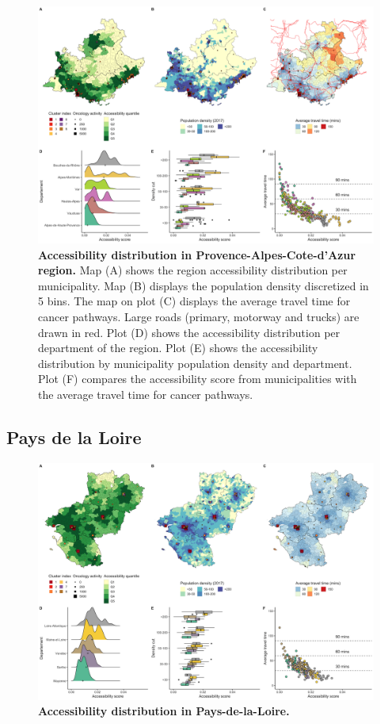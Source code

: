 \begin{figure}[H]
    \includegraphics[width=\textwidth]{images/camion/fig4_accessibility_Provence-Alpes-Cote-d'Azur.png}
    \centering
    \caption{
        \textbf{Accessibility distribution in Provence-Alpes-Cote-d'Azur region.} Map (A) shows the region accessibility distribution per municipality. Map (B) displays the population density discretized in 5 bins. The map on plot (C) displays the average travel time for cancer pathways. Large roads (primary, motorway and trucks) are drawn in red. Plot (D) shows the accessibility distribution per department of the region. Plot (E) shows the accessibility distribution by municipality population density and department. Plot (F) compares the accessibility score from municipalities with the average travel time for cancer pathways.
    }
    \label{fig:accessibility-paca}
\end{figure}

\subsection*{Pays de la Loire}

\begin{figure}[H]
    \includegraphics[width=\textwidth]{images/camion/region_accessibility/accessibility_Pays-de-la-Loire.png}
    \centering
    \caption{
        \textbf{Accessibility distribution in Pays-de-la-Loire.}
    }
\end{figure}

